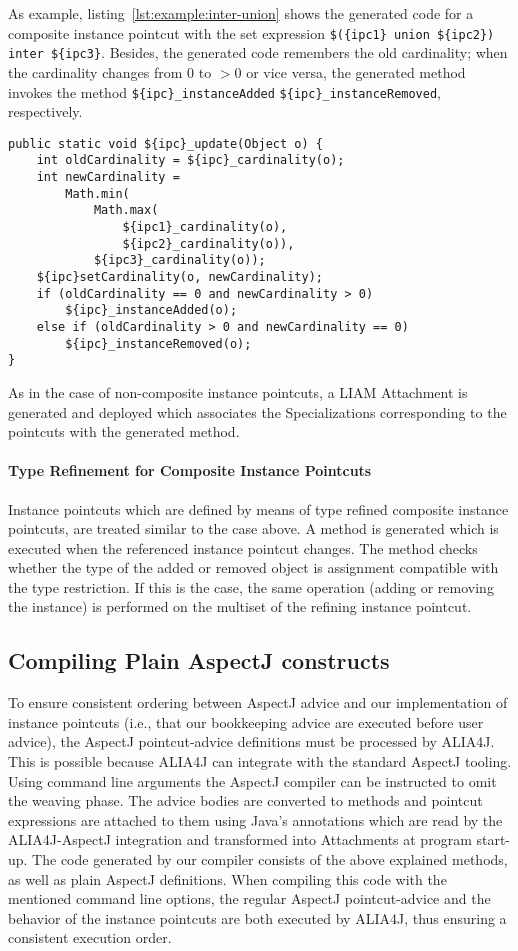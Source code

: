 As example, listing~\ref{lst:example:inter-union} shows the generated code for a composite instance pointcut with the set expression \lstinline!$({ipc1} union ${ipc2}) inter ${ipc3}!. Besides, the generated code remembers the old cardinality; when the cardinality changes from $0$ to $>0$ or vice versa, the generated method invokes the method \lstinline!${ipc}_instanceAdded! \lstinline!${ipc}_instanceRemoved!, respectively.

\begin{lstlisting}[float,caption={The update method generated from a composition expression},label=lst:example:inter-union]
public static void ${ipc}_update(Object o) {
	int oldCardinality = ${ipc}_cardinality(o);
	int newCardinality =
		Math.min(
			Math.max(
				${ipc1}_cardinality(o),
				${ipc2}_cardinality(o)),
			${ipc3}_cardinality(o));
	${ipc}setCardinality(o, newCardinality);
	if (oldCardinality == 0 and newCardinality > 0)
		${ipc}_instanceAdded(o);
	else if (oldCardinality > 0 and newCardinality == 0)
		${ipc}_instanceRemoved(o);
}
\end{lstlisting}

As in the case of non-composite instance pointcuts, a LIAM Attachment is generated and deployed which associates the Specializations corresponding to the pointcuts with the generated method.

\paragraph{Type Refinement for Composite Instance Pointcuts}

Instance pointcuts which are defined by means of type refined composite instance pointcuts, are treated similar to the case above.
A method is generated which is executed when the referenced instance pointcut changes.
The method checks whether the type of the added or removed object is assignment compatible with the type restriction.
If this is the case, the same operation (adding or removing the instance) is performed on the multiset of the refining instance pointcut.

\subsection{Compiling Plain AspectJ constructs}
To ensure consistent ordering between AspectJ advice and our implementation of instance pointcuts (i.e., that our bookkeeping advice are executed before user advice), the AspectJ point\-cut-advice definitions must be processed by ALIA4J.
This is possible because ALIA4J can integrate with the standard AspectJ tooling.
Using command line arguments the AspectJ compiler can be instructed to omit the weaving phase.
The advice bodies are converted to methods and pointcut expressions are attached to them using Java's annotations which are read by the ALIA4J-AspectJ integration and transformed into Attachments at program start-up.
The code generated by our compiler consists of the above explained methods, as well as plain AspectJ definitions.
When compiling this code with the mentioned command line options, the regular AspectJ pointcut-advice and the behavior of the instance pointcuts are both executed by ALIA4J, thus ensuring a consistent execution order.

